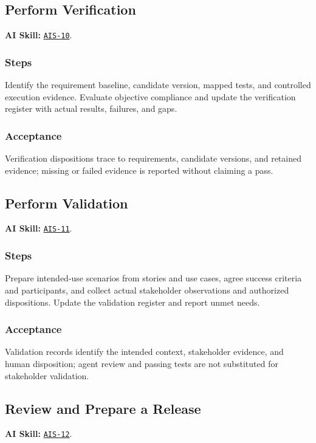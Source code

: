 \subsection{Perform Verification}
\label{Section:AIVerificationSteps}
\noindent\textbf{AI Skill:} \hyperref[Skill:AIS-10]{\texttt{AIS-10}}.

\subsubsection*{Steps}
\label{Section:AIVerificationTaskSteps}
Identify the requirement baseline, candidate version, mapped tests, and controlled execution evidence. Evaluate objective compliance and update the verification register with actual results, failures, and gaps.

\subsubsection*{Acceptance}
\label{Section:AIVerificationAcceptance}
Verification dispositions trace to requirements, candidate versions, and retained evidence; missing or failed evidence is reported without claiming a pass.

\subsection{Perform Validation}
\label{Section:AIValidationSteps}
\noindent\textbf{AI Skill:} \hyperref[Skill:AIS-11]{\texttt{AIS-11}}.

\subsubsection*{Steps}
\label{Section:AIValidationTaskSteps}
Prepare intended-use scenarios from stories and use cases, agree success criteria and participants, and collect actual stakeholder observations and authorized dispositions. Update the validation register and report unmet needs.

\subsubsection*{Acceptance}
\label{Section:AIValidationAcceptance}
Validation records identify the intended context, stakeholder evidence, and human disposition; agent review and passing tests are not substituted for stakeholder validation.

\subsection{Review and Prepare a Release}
\label{Section:AIReleaseSteps}
\noindent\textbf{AI Skill:} \hyperref[Skill:AIS-12]{\texttt{AIS-12}}.


